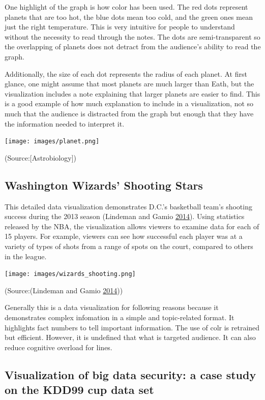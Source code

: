 \documentclass[]{book}
\begin{document}
One highlight of the graph is how color has been used. The red dots represent planets that are too hot, the blue dots mean too cold, and the green ones mean just the right temperature. This is very intuitive for people to understand without the necessity to read through the notes. The dots are semi-transparent so the overlapping of planets does not detract from the audience's ability to read the graph.

Additionally, the size of each dot represents the radius of each planet. At first glance, one might assume that most planets are much larger than Eath, but the visualization includes a note explaining that larger planets are easier to find. This is a good example of how much explanation to include in a visualization, not so much that the audience is distracted from the graph but enough that they have the information needed to interpret it.

\texttt{[image: images/planet.png]}

(Source:{[}Astrobiology{]})

\hypertarget{washington-wizards-shooting-stars}{%
\subsection{Washington Wizards' Shooting Stars}\label{washington-wizards-shooting-stars}}

This detailed data visualization demonstrates D.C.'s basketball team's shooting success during the 2013 season (Lindeman and Gamio \protect\hyperlink{ref-basketball}{2014}). Using statistics released by the NBA, the visualization allows viewers to examine data for each of 15 players. For example, viewers can see how successful each player was at a variety of types of shots from a range of spots on the court, compared to others in the league.

\texttt{[image: images/wizards\_shooting.png]}

(Source:(Lindeman and Gamio \protect\hyperlink{ref-basketball}{2014}))

Generally this is a data visualization for following reasons because it demonstrates complex infomation in a simple and topic-related format. It highlights fact numbers to tell important information. The use of colr is retrained but efficient. However, it is undefined that what is targeted audience. It can also reduce cognitive overload for lines.

\hypertarget{visualization-of-big-data-security-a-case-study-on-the-kdd99-cup-data-set}{%
\subsection{Visualization of big data security: a case study on the KDD99 cup data set}\label{visualization-of-big-data-security-a-case-study-on-the-kdd99-cup-data-set}}
\end{document}
